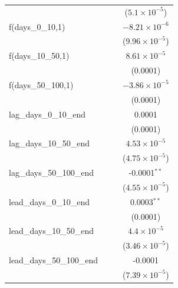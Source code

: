 \begin{tabular}{lccc}
                                          &          &                       & ($5.1\times 10^{-5}$)\\    
   f(days\_0\_10,1)                       &          &                       & $-8.21\times 10^{-6}$\\    
                                          &          &                       & ($9.96\times 10^{-5}$)\\    
   f(days\_10\_50,1)                      &          &                       & $8.61\times 10^{-5}$\\    
                                          &          &                       & (0.0001)\\   
   f(days\_50\_100,1)                     &          &                       & $-3.86\times 10^{-5}$\\    
                                          &          &                       & (0.0001)\\   
   lag\_days\_0\_10\_end                  &          &                       & 0.0001\\   
                                          &          &                       & (0.0001)\\   
   lag\_days\_10\_50\_end                 &          &                       & $4.53\times 10^{-5}$\\    
                                          &          &                       & ($4.75\times 10^{-5}$)\\    
   lag\_days\_50\_100\_end                &          &                       & -0.0001$^{**}$\\   
                                          &          &                       & ($4.55\times 10^{-5}$)\\    
   lead\_days\_0\_10\_end                 &          &                       & 0.0003$^{**}$\\   
                                          &          &                       & (0.0001)\\   
   lead\_days\_10\_50\_end                &          &                       & $4.4\times 10^{-5}$\\    
                                          &          &                       & ($3.46\times 10^{-5}$)\\    
   lead\_days\_50\_100\_end               &          &                       & -0.0001\\   
                                          &          &                       & ($7.39\times 10^{-5}$)\\    

\end{tabular}
